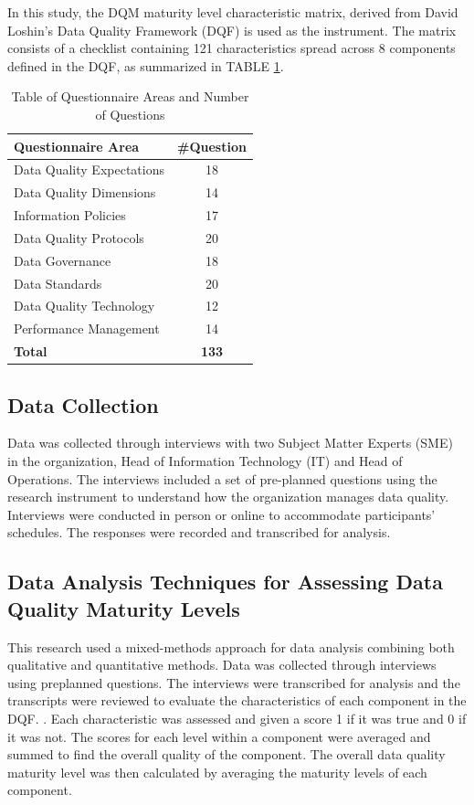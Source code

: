 \documentclass[conference]{IEEEtran}
\begin{document}
In this study, the DQM maturity level characteristic matrix, derived from David Loshin’s Data Quality Framework (DQF) \cite{loshin_dqi} is used as the instrument. The matrix consists of a checklist containing 121 characteristics spread across 8 components defined in the DQF, as summarized in TABLE \ref{tab:questionnare-areas}. 
\begin{table}[H]
\caption{Table of Questionnaire Areas and Number of Questions}
\label{tab:questionnare-areas}
\centering
\begin{tabular}{|l|c|}
\hline
\textbf{Questionnaire Area} & \textbf{\#Question} \\
\hline
Data Quality Expectations & 18 \\
\hline
Data Quality Dimensions & 14 \\
\hline
Information Policies & 17 \\
\hline
Data Quality Protocols & 20 \\
\hline
Data Governance & 18 \\
\hline
Data Standards & 20 \\
\hline
Data Quality Technology & 12 \\
\hline
Performance Management & 14 \\
\hline
\textbf{Total} & \textbf{133} \\
\hline
\end{tabular}
\end{table}

\subsection{Data Collection}
Data was collected through interviews with two Subject Matter Experts (SME) in the organization, Head of Information Technology (IT) and Head of Operations. The interviews included a set of pre-planned questions using the research instrument to understand how the organization manages data quality. Interviews were conducted in person or online to accommodate participants’ schedules. The responses were recorded and transcribed for analysis.

\subsection{Data Analysis Techniques for Assessing Data Quality Maturity Levels}
This research used a mixed-methods approach for data analysis combining both qualitative and quantitative methods. Data was collected through interviews using preplanned questions. The interviews were transcribed for analysis and the transcripts were reviewed to evaluate the characteristics of each component in the DQF. \cite{loshin_dqi}.
Each characteristic was assessed and given a score 1 if it was true and 0 if it was not. The scores for each level within a component were averaged and summed to find the overall quality of the component. The overall data quality maturity level was then calculated by averaging the maturity levels of each component.
\end{document}
